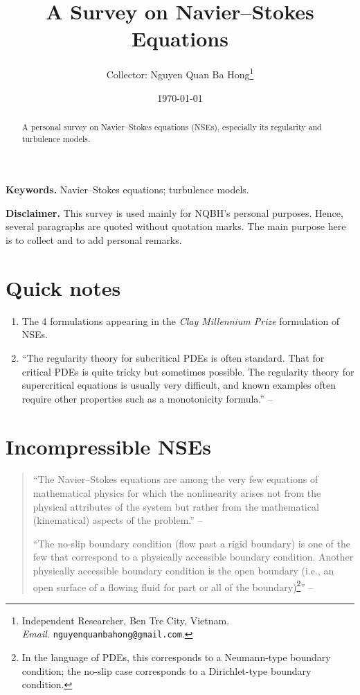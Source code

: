 \documentclass{article}
\title{A Survey on Navier--Stokes Equations}
\author{Collector: Nguyen Quan Ba Hong\footnote{Independent Researcher, Ben Tre City, Vietnam.\\\textit{Email.} \texttt{nguyenquanbahong@gmail.com}.}}
\date{\today}
\numberwithin{equation}{section}
\begin{document}
\maketitle

\begin{abstract}
	A personal survey on Navier--Stokes equations (NSEs), especially its regularity and turbulence models.
\end{abstract}
\textbf{Keywords.} Navier--Stokes equations; turbulence models.

\tableofcontents

\vspace{5mm}
\textbf{Disclaimer.} This survey is used mainly for NQBH's personal purposes. Hence, several paragraphs are quoted without quotation marks. The main purpose here is to collect and to add personal remarks.
\section*{Quick notes}
\begin{enumerate}
	\item The 4 formulations appearing in the \textit{Clay Millennium Prize} formulation \cite{Fefferman2006} of NSEs.
	\item ``The regularity theory for subcritical PDEs is often standard. That for critical PDEs is quite tricky but sometimes possible. The regularity theory for supercritical equations is usually very difficult, and known examples often require other properties such as a monotonicity formula.'' -- \cite[p. 7]{Tsai2018}
\end{enumerate}


\section{Incompressible NSEs}
\begin{quotation}
	``The Navier--Stokes equations are among the very few equations of mathematical physics for which the nonlinearity arises not from the physical attributes of the system but rather from the mathematical (kinematical) aspects of the problem.'' -- \cite[p. 2]{Foias_Manley_Rosa_Temam2001}
	
	``The no-slip boundary condition (flow past a rigid boundary) is one of the few that correspond to a physically accessible boundary condition. Another physically accessible boundary condition is the open boundary (i.e., an open surface of a flowing fluid for part or all of the boundary)\footnote{In the language of PDEs, this corresponds to a Neumann-type boundary condition; the no-slip case corresponds to a Dirichlet-type boundary condition.}'' -- \cite[p. 45]{Foias_Manley_Rosa_Temam2001}
\end{quotation}
\end{document}
